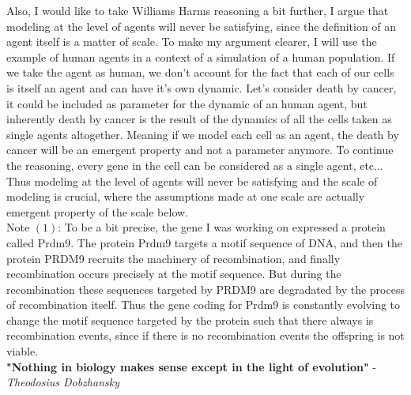 \documentclass[10pt]{article}
\begin{document}
Also, I would like to take Williams Harms reasoning a bit further, I argue that modeling at the level of agents will never be satisfying, since the definition of an agent itself is a matter of scale. To make my argument clearer, I will use the example of human agents in a context of a simulation of a human population. If we take the agent as human, we don't account for the fact that each of our cells is itself an agent and can have it's own dynamic. Let's consider death by cancer, it could be included as parameter for the dynamic of an human agent, but inherently death by cancer is the result of the dynamics of all the cells taken as single agents altogether. Meaning if we model each cell as an agent, the death by cancer will be an emergent property and not a parameter anymore. To continue the reasoning, every gene in the cell can be considered as a single agent, etc... Thus modeling at the level of agents will never be satisfying and the scale of modeling is crucial, where the assumptions made at one scale are actually emergent property of the scale below.\\

Note ${(1)}$: To be a bit precise, the gene I was working on expressed a protein called Prdm9. The protein Prdm9 targets a motif sequence of DNA, and then the protein PRDM9 recruits the machinery of recombination, and finally recombination occurs precisely at the motif sequence. But during the recombination these sequences targeted by PRDM9 are degradated by the process of recombination itself. Thus the gene coding for Prdm9 is constantly evolving to change the motif sequence targeted by the protein such that there always is recombination events, since if there is no recombination events the offspring is not viable. \\

\textbf{"Nothing in biology makes sense except in the light of evolution"} - \textit{Theodosius Dobzhansky}
\end{document}
